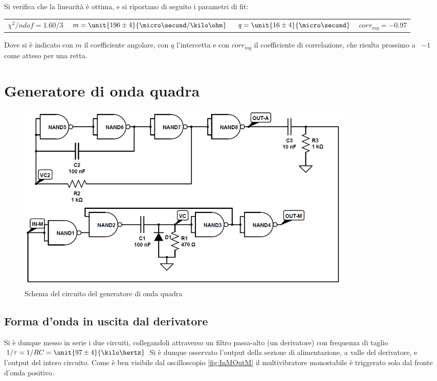 \documentclass[a4paper,10pt]{article}
\begin{document}
Si verifica che la linearità è ottima, e si riportano di seguito i parametri di fit:

\begin{table}[H]
	\centering
	\begin{tabular}{cccc}
		$\chi^2/ndof = 1.60/3$ & $m = \unit{196 \pm 4}{\micro\second / \kilo\ohm}$ & $q = \unit{16 \pm 4}{\micro\second}$ & $corr_{mq} = -0.97$\\
	\end{tabular}
\end{table}

Dove si è indicato con $m$ il coefficiente angolare, con $q$ l'intercetta e con $corr_{mq}$ il coefficiente di correlazione, che risulta prossimo a ~$-1$ come atteso per una retta.

\section{Generatore di onda quadra}

\begin{figure}[H]
	\centering
	\includegraphics[width=0.8\textwidth]{../grafici/SqGen.png}
	\caption{Schema del circuito del generatore di onda quadra}
	\label{fig:SQGEN}
\end{figure}

\subsection{Forma d'onda in uscita dal derivatore}

Si è dunque messo in serie i due circuiti, collegandoli attraverso un filtro passa-alto (un derivatore) con frequenza di taglio $1/\tau=1/RC=\unit{97 \pm 4}{\kilo\hertz}$
Si è dunque osservato l'output della sezione di alimentazione, a valle del derivatore, e l'output del intero circuito. Come è ben visibile dal oscilloscopio \cref{fig:InMOutM} il multivibratore monostabile è triggerato solo dal fronte d'onda positivo. 
\end{document}
